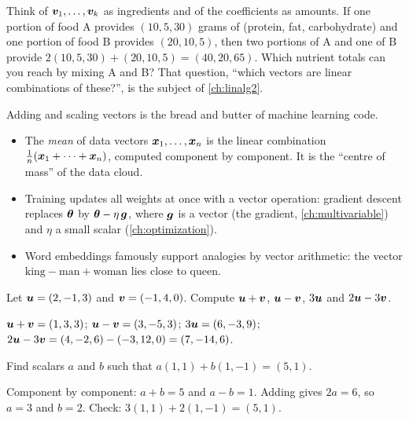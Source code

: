 \begin{intuition}
Think of $\bm{v}_1, \dots, \bm{v}_k$ as ingredients and of the coefficients as
amounts. If one portion of food A provides $(10, 5, 30)$ grams of (protein,
fat, carbohydrate) and one portion of food B provides $(20, 10, 5)$, then two
portions of A and one of B provide $2(10, 5, 30) + (20, 10, 5) = (40, 20,
65)$. Which nutrient totals can you reach by mixing A and B? That question,
``which vectors are linear combinations of these?'', is the subject of
\cref{ch:linalg2}.
\end{intuition}

\begin{mlnote}
Adding and scaling vectors is the bread and butter of machine learning code.
\begin{itemize}
  \item The \emph{mean} of data vectors $\bm{x}_1, \dots, \bm{x}_n$ is the linear
    combination $\frac1n(\bm{x}_1 + \dots + \bm{x}_n)$, computed component by
    component. It is the ``centre of mass'' of the data cloud.
  \item Training updates all weights at once with a vector operation: gradient
    descent replaces $\bm{\theta}$ by $\bm{\theta} - \eta\,\bm{g}$, where $\bm{g}$ is a vector
    (the gradient, \cref{ch:multivariable}) and $\eta$ a small scalar
    (\cref{ch:optimization}).
  \item Word embeddings famously support analogies by vector arithmetic: the
    vector $\text{king} - \text{man} + \text{woman}$ lies close to
    $\text{queen}$.
\end{itemize}
\end{mlnote}

\sectionexercises

\begin{exercise}
Let $\bm{u} = (2, -1, 3)$ and $\bm{v} = (-1, 4, 0)$. Compute $\bm{u} + \bm{v}$,
$\bm{u} - \bm{v}$, $3\bm{u}$ and $2\bm{u} - 3\bm{v}$.
\end{exercise}
\begin{solution}
$\bm{u} + \bm{v} = (1, 3, 3)$; $\bm{u} - \bm{v} = (3, -5, 3)$; $3\bm{u} = (6, -3, 9)$;
$2\bm{u} - 3\bm{v} = (4, -2, 6) - (-3, 12, 0) = (7, -14, 6)$.
\end{solution}

\begin{exercise}
Find scalars $a$ and $b$ such that $a(1, 1) + b(1, -1) = (5, 1)$.
\end{exercise}
\begin{solution}
Component by component: $a + b = 5$ and $a - b = 1$. Adding gives $2a = 6$, so
$a = 3$ and $b = 2$. Check: $3(1,1) + 2(1,-1) = (5, 1)$.
\end{solution}

